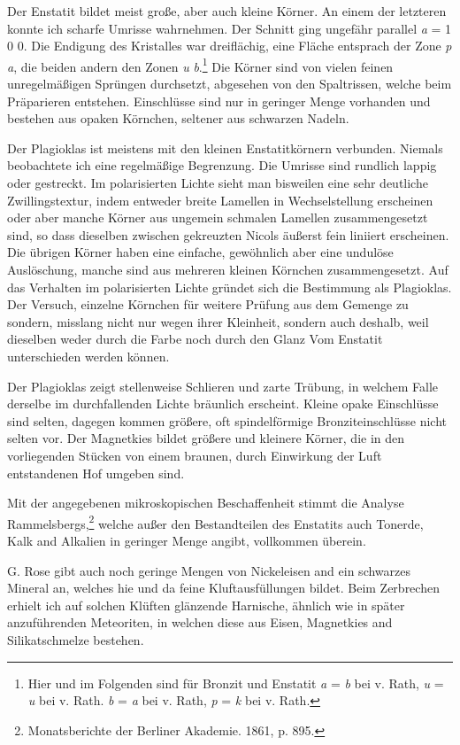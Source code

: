 \documentclass[a4paper, 12pt, oneside]{article}
\begin{document}
Der Enstatit bildet meist große, aber auch kleine Körner. An einem der letzteren konnte ich scharfe Umrisse wahrnehmen. Der Schnitt ging ungefähr parallel \emph{a} = 1 0 0. Die Endigung des Kristalles war dreiflächig, eine Fläche entsprach der Zone \emph{p} \emph{a},  die beiden andern den Zonen \emph{u} \emph{b}.\footnote{Hier und im Folgenden sind für Bronzit und Enstatit \emph{a} = \emph{b} bei v. Rath, \emph{u} = \emph{u} bei v. Rath. \emph{b} = \emph{a} bei v. Rath, \emph{p} = \emph{k} bei v. Rath.} Die Körner sind von vielen feinen unregelmäßigen Sprüngen durchsetzt, abgesehen von den Spaltrissen, welche beim Präparieren entstehen. Einschlüsse sind nur in geringer Menge vorhanden und bestehen aus opaken Körnchen, seltener aus schwarzen Nadeln.

Der Plagioklas ist meistens mit den kleinen Enstatitkörnern verbunden. Niemals beobachtete ich eine regelmäßige Begrenzung. Die Umrisse sind rundlich lappig oder gestreckt. Im polarisierten Lichte sieht man bisweilen eine sehr deutliche Zwillingstextur, indem entweder breite Lamellen in Wechselstellung erscheinen oder aber manche Körner aus ungemein schmalen Lamellen zusammengesetzt sind, so dass dieselben zwischen gekreuzten Nicols äußerst fein liniiert erscheinen. Die übrigen Körner haben eine einfache, gewöhnlich aber eine undulöse Auslöschung, manche sind aus mehreren kleinen Körnchen zusammengesetzt. Auf das Verhalten im polarisierten Lichte gründet sich die Bestimmung als Plagioklas. Der Versuch, einzelne Körnchen für weitere Prüfung aus dem Gemenge zu sondern, misslang nicht nur wegen ihrer Kleinheit, sondern auch deshalb, weil dieselben weder durch die Farbe noch durch den Glanz Vom Enstatit unterschieden werden können.

Der Plagioklas zeigt stellenweise Schlieren und zarte Trübung, in welchem Falle derselbe im durchfallenden Lichte bräunlich erscheint. Kleine opake Einschlüsse sind selten, dagegen kommen größere, oft spindelförmige Bronziteinschlüsse nicht selten vor. Der Magnetkies bildet größere und kleinere Körner, die in den vorliegenden Stücken von einem braunen, durch Einwirkung der Luft entstandenen Hof umgeben sind.

Mit der angegebenen mikroskopischen Beschaffenheit stimmt die Analyse Rammelsbergs,\footnote{Monatsberichte der Berliner Akademie. 1861, p. 895.} welche außer den Bestandteilen des Enstatits auch Tonerde, Kalk and Alkalien in geringer Menge angibt, vollkommen überein.

G. Rose gibt auch noch geringe Mengen von Nickeleisen and ein schwarzes Mineral an, welches hie und da feine Kluftausfüllungen bildet. Beim Zerbrechen erhielt ich auf solchen Klüften glänzende Harnische, ähnlich wie in später anzuführenden Meteoriten, in welchen diese aus Eisen, Magnetkies and Silikatschmelze bestehen.
\end{document}
